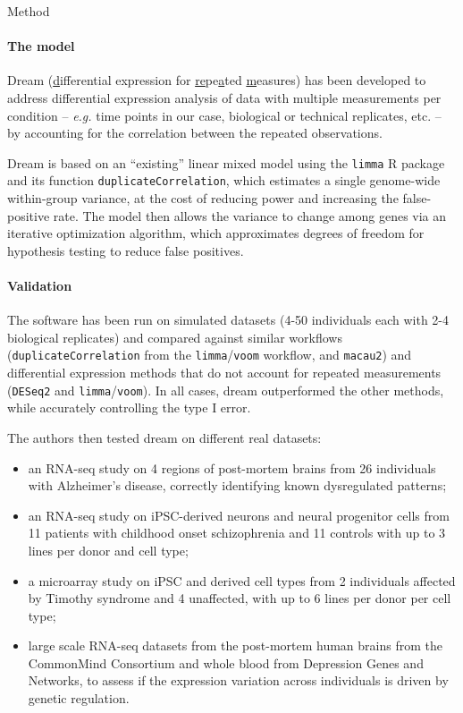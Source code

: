 \documentclass[10pt,a4paper]{article}
\newlength{\templength}
\newenvironment{ann_section}[1]
{\settowidth{\templength}{#1}%
\noindent\textbf{#1}
\hspace{1em}\begin{minipage}[t]{\dimexpr \linewidth-\the\templength-2em}}
{\end{minipage}\par\bigskip}
\begin{document}
\begin{ann_section}{Method}
\paragraph{The model} Dream (\underline{d}ifferential expression for \underline{re}pe\underline{a}ted \underline{m}easures) has been developed to address differential expression analysis of data with multiple measurements per condition -- \textit{e.g.} time points in our case, biological or technical replicates, etc. -- by accounting for the correlation between the repeated observations.

Dream is based on an ``existing'' linear mixed model using the \texttt{limma} R package and its function \texttt{duplicateCorrelation}, which estimates a single genome-wide within-group variance, at the cost of reducing power and increasing the false-positive rate. The model then allows the variance to change among genes via an iterative optimization algorithm, which approximates degrees of freedom for hypothesis testing to reduce false positives.

\paragraph{Validation} The software has been run on simulated datasets (4-50 individuals each with 2-4 biological replicates) and compared against similar workflows (\texttt{duplicateCorrelation} from the \texttt{limma}/\texttt{voom} workflow, and \texttt{macau2}) and differential expression methods that do not account for repeated measurements (\texttt{DESeq2} and \texttt{limma}/\texttt{voom}). In all cases, dream outperformed the other methods, while accurately controlling the type I error.

The authors then tested dream on different real datasets:
\begin{itemize}
    \item an RNA-seq study on 4 regions of post-mortem brains from 26 individuals with Alzheimer's disease, correctly identifying known dysregulated patterns;
    \item an RNA-seq study on iPSC-derived neurons and neural progenitor cells from 11 patients with childhood onset schizophrenia and 11 controls with up to 3 lines per donor and cell type;
    \item a microarray study on iPSC and derived cell types from 2 individuals affected by Timothy syndrome and 4 unaffected, with up to 6 lines per donor per cell type;
    \item large scale RNA-seq datasets from the post-mortem human brains from the CommonMind Consortium and whole blood from Depression Genes and Networks, to assess if the expression variation across individuals is driven by genetic regulation.
\end{itemize}
\end{ann_section}
\end{document}
